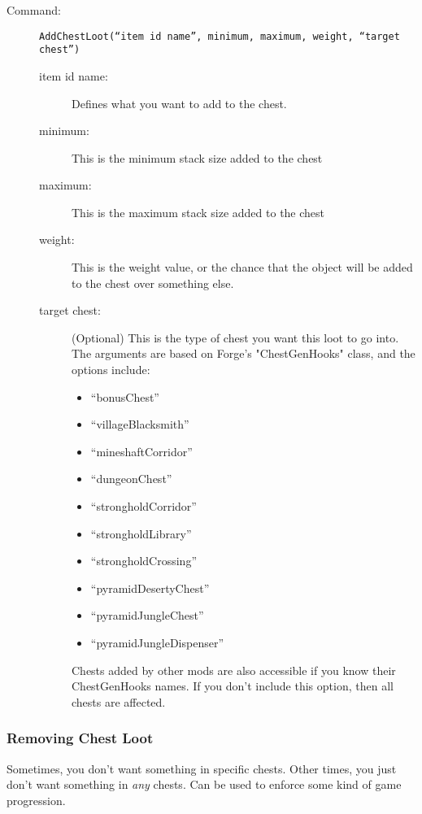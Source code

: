 \documentclass[letterpaper,titlepage,12pt]{article}
\begin{document}
\begin{description}
\item[Command:] \texttt{AddChestLoot(``item id name'', minimum, maximum, weight, ``target chest'')}
\begin{description}
\item [item id name:] Defines what you want to add to the chest.
\item [minimum:] This is the minimum stack size added to the chest
\item [maximum:] This is the maximum stack size added to the chest
\item [weight:] This is the weight value, or the chance that the object will be added to the chest over something else.
\item [target chest:] (Optional) This is the type of chest you want this loot to go into.  The arguments are based on Forge's "ChestGenHooks" class, and the options include:
\begin{multicols}{2}
\begin{itemize}
\item ``bonusChest''
\item ``villageBlacksmith''
\item ``mineshaftCorridor''
\item ``dungeonChest''
\item ``strongholdCorridor''
\item ``strongholdLibrary''
\item ``strongholdCrossing''
\item ``pyramidDesertyChest''
\item ``pyramidJungleChest''
\item ``pyramidJungleDispenser''
\end{itemize}
\end{multicols}

Chests added by other mods are also accessible if you know their ChestGenHooks names.  If you don't include this option, then all chests are affected.
\end{description}
\end{description}

\subsubsection{Removing Chest Loot}

Sometimes, you don't want something in specific chests.  Other times, you just don't want something in \emph{any} chests.  Can be used to enforce some kind of game progression.
\end{document}
